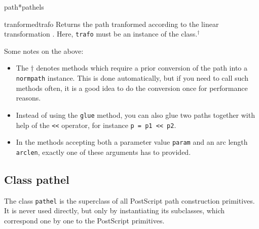 \begin{classdesc}{path}{*pathels}
\begin{methoddesc}{tranformed}{trafo}
  Returns the path tranformed according to the linear transformation
  . Here, \texttt{trafo} must be an instance of the
   class.$^\dagger$
\end{methoddesc}

Some notes on the above:
\begin{itemize}
\item The $\dagger$ denotes methods which require a prior
  conversion of the path into a \verb|normpath| instance. This is
  done automatically, but if you need to call such methods often,
  it is a good idea to do the conversion once for performance reasons.
\item Instead of using the \verb|glue| method, you can also glue two
paths together with help of the \verb|<<| operator, for instance
\verb|p = p1 << p2|.
\item In the methods accepting both a parameter value \verb|param| and
  an arc length \verb|arclen|, exactly one of these arguments has to
  provided.
\end{itemize}

\end{classdesc}


\subsection{Class pathel}

The class \verb|pathel| is the superclass of all PostScript path
construction primitives. It is never used directly, but only by
instantiating its subclasses, which correspond one by one to the
PostScript primitives.

